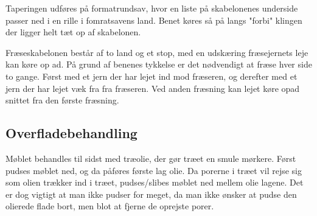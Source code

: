 Taperingen udføres på formatrundsav, hvor en liste på skabelonenes underside
passer ned i en rille i fomratsavens land. Benet køres så på langs "forbi"
klingen der ligger helt tæt op af skabelonen.

Fræseskabelonen består af to land og et stop, med en udskæring fræsejernets leje kan køre
op ad. På grund af benenes tykkelse er det nødvendigt at fræse hver side to
gange. Først med et jern der har lejet ind mod fræseren, og derefter med et jern
der har lejet væk fra fra fræseren. Ved anden fræsning kan lejet køre opad
snittet fra den første fræsning.

\subsection*{Overfladebehandling}
Møblet behandles til sidst med træolie, der gør træet en smule mørkere. Først
pudses møblet ned, og da påføres første lag olie. Da porerne i træet vil rejse
sig som olien trækker ind i træet, pudses/slibes møblet ned mellem olie lagene.
Det er dog vigtigt at man ikke pudser for meget, da man ikke ønsker at pudse den
olierede flade bort, men blot at fjerne de oprejste porer.
